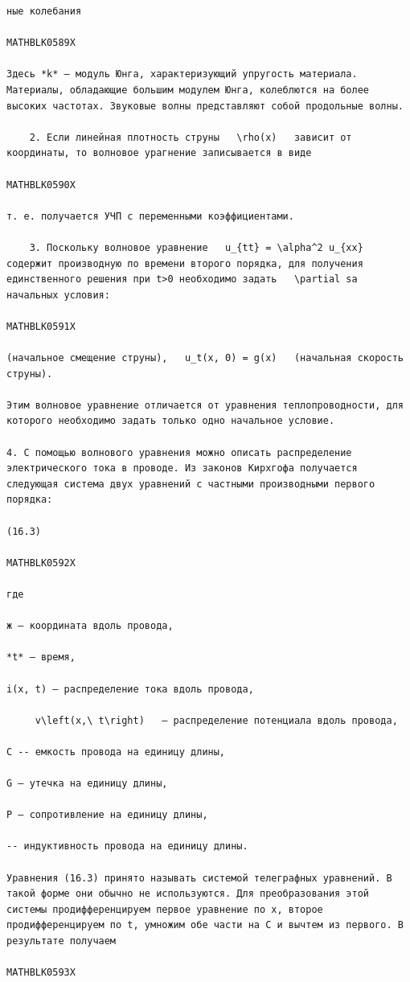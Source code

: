 \documentclass[
]{article}
\begin{document}
\begin{verbatim}
ные колебания

MATHBLK0589X

Здесь *k* — модуль Юнга, характеризующий упругость материала. Материалы, обладающие большим модулем Юнга, колеблются на более высоких частотах. Звуковые волны представляют собой продольные волны.

    2. Если линейная плотность струны   \rho(x)   зависит от координаты, то волновое урагнение записывается в виде

MATHBLK0590X

т. е. получается УЧП с переменными коэффициентами.

    3. Поскольку волновое уравнение   u_{tt} = \alpha^2 u_{xx}   содержит производную по времени второго порядка, для получения единственного решения при t>0 необходимо задать   \partial sa   начальных условия:

MATHBLK0591X

(начальное смещение струны),   u_t(x, 0) = g(x)   (начальная скорость струны).

Этим волновое уравнение отличается от уравнения теплопроводности, для которого необходимо задать только одно начальное условие.

4. С помощью волнового уравнения можно описать распределение электрического тока в проводе. Из законов Кирхгофа получается следующая система двух уравнений с частными производными первого порядка:

(16.3)

MATHBLK0592X

где

ж — координата вдоль провода,

*t* — время,

i(x, t) — распределение тока вдоль провода,

     v\left(x,\ t\right)   — распределение потенциала вдоль провода,

С -- емкость провода на единицу длины,

G — утечка на единицу длины,

Р — сопротивление на единицу длины,

-- индуктивность провода на единицу длины.

Уравнения (16.3) принято называть системой телеграфных уравнений. В такой форме они обычно не используются. Для преобразования этой системы продифференцируем первое уравнение по x, второе продифференцируем по t, умножим обе части на C и вычтем из первого. В результате получаем

MATHBLK0593X


\end{verbatim}
\end{document}
